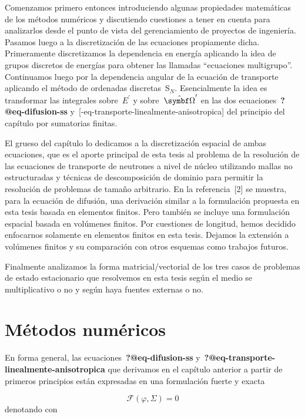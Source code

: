\documentclass[
  12pt,
  a4paper,
  table]{scrbook}
\theoremstyle{plain}
\theoremstyle{definition}
\theoremstyle{plain}
\theoremstyle{plain}
\theoremstyle{remark}
\begin{document}
Comenzamos primero entonces introduciendo algunas propiedades
matemáticas de los métodos numéricos y discutiendo cuestiones a tener en
cuenta para analizarlos desde el punto de vista del gerenciamiento de
proyectos de ingeniería. Pasamos luego a la discretización de las
ecuaciones propiamente dicha. Primeramente discretizamos la dependencia
en energía aplicando la idea de grupos discretos de energías para
obtener las llamadas ``ecuaciones multigrupo''. Continuamos luego por la
dependencia angular de la ecuación de transporte aplicando el método de
ordenadas discretas~S\(_N\). Esencialmente la idea es transformar las
integrales sobre~\(E^\prime\) y sobre~\(\omegaprimaversor\) en las dos
ecuaciones~\textbf{?@eq-difusion-ss}
y~{[}-eq-transporte-linealmente-anisotropica{]} del principio del
capítulo por sumatorias finitas.

El grueso del capítulo lo dedicamos a la discretización espacial de
ambas ecuaciones, que es el aporte principal de esta tesis al problema
de la resolución de las ecuaciones de transporte de neutrones a nivel de
núcleo utilizando mallas no estructuradas y técnicas de descomposición
de dominio para permitir la resolución de problemas de tamaño
arbitrario. En la referencia~{[}2{]} se muestra, para la ecuación de
difusión, una derivación similar a la formulación propuesta en esta
tesis basada en elementos finitos. Pero también se incluye una
formulación espacial basada en volúmenes finitos. Por cuestiones de
longitud, hemos decidido enfocarnos solamente en elementos finitos en
esta tesis. Dejamos la extensión a volúmenes finitos y su comparación
con otros esquemas como trabajos futuros.

Finalmente analizamos la forma matricial/vectorial de los tres casos de
problemas de estado estacionario que resolvemos en esta tesis según el
medio se multiplicativo o no y según haya fuentes externas o no.

\hypertarget{sec-metodos-numericos}{%
\section{Métodos numéricos}\label{sec-metodos-numericos}}

En forma general, las ecuaciones~\textbf{?@eq-difusion-ss}
y~\textbf{?@eq-transporte-linealmente-anisotropica} que derivamos en el
capítulo anterior a partir de primeros principios están expresadas en
una formulación fuerte y exacta

\[
\mathcal{F}(\varphi, \Sigma) = 0
\] denotando con
\end{document}
